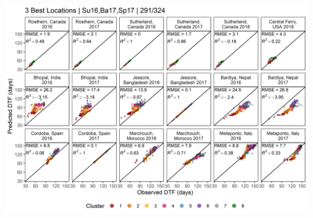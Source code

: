 \documentclass[
]{article}
\begin{document}
\includegraphics{Additional/Model/Model_2_4.png}
\end{document}
